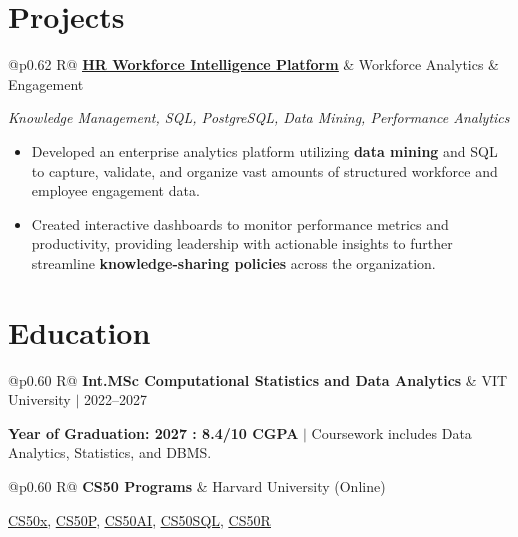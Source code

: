 \documentclass[a4paper,10pt]{article}
\newcommand{\ulink}[2]{\href{#1}{\uline{#2}}}
\newcommand{\subheading}[1]{{\color[HTML]{0A0A0A}\fontsize{12}{14}\selectfont\bfseries #1}}
\newcommand{\techstack}[1]{{\color[HTML]{5C5C5C}\fontsize{10.5}{12.5}\selectfont\itshape #1}}
\newcommand{\meta}[1]{{\color[HTML]{5C5C5C}\fontsize{10.5}{12.5}\selectfont #1}}
\begin{document}
\section{Projects}
\vspace{2pt}

\begin{tabularx}{\linewidth}{@{}p{0.62\linewidth} R@{}}
\subheading{\ulink{https://github.com/su-jin1425/HR-Workforce-Intelligence-Platform}{HR Workforce Intelligence Platform}} & \meta{Workforce Analytics \& Engagement}
\end{tabularx}
\vspace{1pt}
\techstack{Knowledge Management, SQL, PostgreSQL, Data Mining, Performance Analytics}
\begin{itemize}[nosep, leftmargin=1.5em, itemsep=1pt, topsep=2pt]
  \item {\color[HTML]{0A0A0A}\fontsize{11}{14}\selectfont Developed an enterprise analytics platform utilizing \textbf{data mining} and SQL to capture, validate, and organize vast amounts of structured workforce and employee engagement data.}
  \item {\color[HTML]{0A0A0A}\fontsize{11}{14}\selectfont Created interactive dashboards to monitor performance metrics and productivity, providing leadership with actionable insights to further streamline \textbf{knowledge-sharing policies} across the organization.}
\end{itemize}

\vspace{2pt}

\section{Education}
\vspace{2pt}

\begin{tabularx}{\linewidth}{@{}p{0.60\linewidth} R@{}}
\subheading{Int.MSc Computational Statistics and Data Analytics} & \meta{VIT University $|$ 2022--2027}
\end{tabularx}
\vspace{1pt}
{\color[HTML]{3A3A3A}\fontsize{11}{14}\selectfont \textbf{Year of Graduation: 2027 : 8.4/10 CGPA} $|$ Coursework includes Data Analytics, Statistics, and DBMS.}

\vspace{1pt}

\begin{tabularx}{\linewidth}{@{}p{0.60\linewidth} R@{}}
\subheading{CS50 Programs} & \meta{Harvard University (Online)}
\end{tabularx}
\vspace{1pt}
{\color[HTML]{3A3A3A}\fontsize{11}{14}\selectfont \ulink{https://cs50.harvard.edu/certificates/b14b78df-e05c-413e-a607-1dd27303053a}{CS50x}, \ulink{https://cs50.harvard.edu/certificates/32477052-9db4-49c4-a5a4-d7e58429ca2c}{CS50P}, \ulink{https://cs50.harvard.edu/certificates/9cdb4d4a-1250-4f8e-9fd7-191864e0f919}{CS50AI}, \ulink{https://cs50.harvard.edu/certificates/bc486f24-f085-4e61-8536-80940b97a1b9}{CS50SQL}, \ulink{https://cs50.harvard.edu/certificates/666838e6-a053-4d82-b179-a60fe745fd84}{CS50R}}
\end{document}
